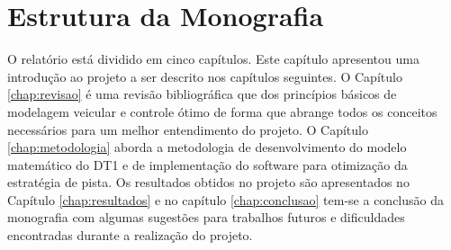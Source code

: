 \section{Estrutura da Monografia}
\label{sec:organizacao}

O relatório está dividido em cinco capítulos. Este capítulo apresentou uma introdução ao projeto a ser descrito nos capítulos seguintes. 
O Capítulo \ref{chap:revisao} é uma revisão bibliográfica que dos princípios básicos de modelagem veicular e controle ótimo de forma que abrange todos os
conceitos necessários para um melhor entendimento do projeto. O Capítulo \ref{chap:metodologia} aborda a metodologia de desenvolvimento do modelo matemático do DT1 e de implementação do software
para otimização da estratégia de pista. Os resultados obtidos no projeto são apresentados no Capítulo \ref{chap:resultados} e no 
capítulo \ref{chap:conclusao} tem-se a conclusão da monografia com algumas sugestões para trabalhos futuros e dificuldades encontradas durante a realização do projeto.

\clearpage